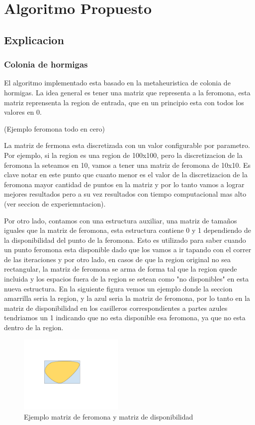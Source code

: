 \newpage
\section{Algoritmo Propuesto}\label{sec:algoritmo}
\subsection{Explicacion}

\subsubsection{Colonia de hormigas}

El algoritmo implementado esta basado en la metaheuristica de colonia de hormigas. La idea general es tener una matriz que representa a la feromona, esta matriz reprensenta la region de entrada, que en un principio esta con todos los valores en 0. 


(Ejemplo feromona todo en cero)

La matriz de fermona esta discretizada con un valor configurable por parametro. Por ejemplo, si la region es una region de 100x100, pero la discretizacion de la feromona la seteamos en 10, vamos a tener una matriz de feromona de 10x10. Es clave notar en este punto que cuanto menor es el valor de la discretizacion de la feromona mayor cantidad de puntos en la matriz y por lo tanto vamos a lograr mejores resultados pero a su vez resultados con tiempo computacional mas alto (ver seccion de experiemntacion).

Por otro lado, contamos con una estructura auxiliar, una matriz de tamaños iguales que la matriz de feromona, esta estructura contiene 0 y 1 dependiendo de la disponibilidad del punto de la feromona. Esto es utilizado para saber cuando un punto feromona esta disponible dado que los vamos a ir tapando con el correr de las iteraciones y por otro lado, en casos de que la region original no sea rectangular, la matriz de feromona se arma de forma tal que la region quede incluida y los espacios fuera de la region se setean como "no disponibles" en esta nueva estructura. En la siguiente figura vemos un ejemplo donde la seccion amarrilla seria la region, y la azul seria la matriz de feromona, por lo tanto en la matriz de disponibilidad en los casilleros correspondientes a partes azules tendriamos un 1 indicando que no esta disponible esa feromona, ya que no esta dentro de la region.

\begin{figure}[h]
\caption{Ejemplo matriz de feromona y matriz de disponibilidad}
\centering
\includegraphics[width=5cm]{imagenes/ejemplo1}
\end{figure}


